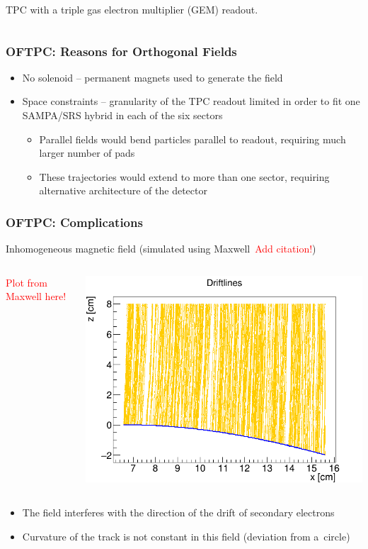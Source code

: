 \documentclass{beamer}
\begin{document}
\begin{frame}
\begin{columns}
\begin{minipage}[t][4.05cm]{\textwidth}
				\end{minipage}
				TPC with a triple gas electron multiplier (GEM) readout.~\cite{poster}
		\end{columns}
	\end{frame}

	\begin{frame}
		\frametitle{OFTPC: Reasons for Orthogonal Fields}
		\begin{itemize}
			\item No solenoid -- permanent magnets used to generate the field
			\item Space constraints -- granularity of the TPC readout limited in order to fit one SAMPA/SRS hybrid in each of the six sectors
			\begin{itemize}
				\item Parallel fields would bend particles parallel to readout, requiring much larger number of pads
				\item These trajectories would extend to more than one sector, requiring alternative architecture of the detector
			\end{itemize}
		\end{itemize}
	\end{frame}
	
	\begin{frame}
		\frametitle{OFTPC: Complications}
		Inhomogeneous magnetic field (simulated using Maxwell~\textcolor{red}{Add citation!})
		\begin{columns}
				\centering
				\textcolor{red}{Plot from Maxwell here!}
				\centering
				\begin{minipage}[t][4cm]{\textwidth}
					\centering
					\includegraphics[width = 0.95 \textwidth]{../images/drift_xz.png}
				\end{minipage}
		\end{columns}
		\begin{itemize}
			\item The field interferes with the direction of the drift of secondary electrons
			\item Curvature of the track is not constant in this field (deviation from a~circle)
		\end{itemize}
	\end{frame}
	
\end{document}
